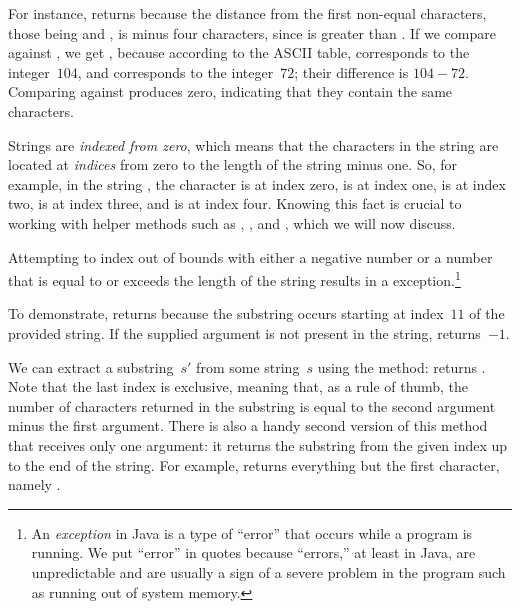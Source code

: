 For instance,  returns  because the distance from the first non-equal characters, those being  and , is minus four characters, since  is greater than . 
If we compare  against , we get , because according to the ASCII table,  corresponds to the integer~$104$, and  corresponds to the integer~$72$; their difference is $104 - 72$. 
Comparing  against  produces zero, indicating that they contain the same characters.

Strings are \emph{indexed from zero}, which means that the characters in the string are located at \emph{indices} from zero to the length of the string minus one. 
So, for example, in the string , the character  is at index zero,  is at index one,  is at index two,  is at index three, and  is at index four. 
Knowing this fact is crucial to working with helper methods such as , , and , which we will now discuss.

Attempting to index out of bounds with either a negative number or a number that is equal to or exceeds the length of the string results in a  exception.\footnote{An \emph{exception} in Java is a type of ``error'' that occurs while a program is running. We put ``error'' in quotes because ``errors,'' at least in Java, are unpredictable and are usually a sign of a severe problem in the program such as running out of system memory.}

To demonstrate,  returns  because the substring  occurs starting at index~$11$ of the provided string. 
If the supplied argument is not present in the string,  returns~$-1$.

We can extract a substring~$s'$ from some string~$s$ using the  method:  returns . 
Note that the last index is exclusive, meaning that, as a rule of thumb, the number of characters returned in the substring is equal to the second argument minus the first argument. 
There is also a handy second version of this method that receives only one argument: it returns the substring from the given index up to the end of the string. 
For example,  returns everything but the first character, namely .

